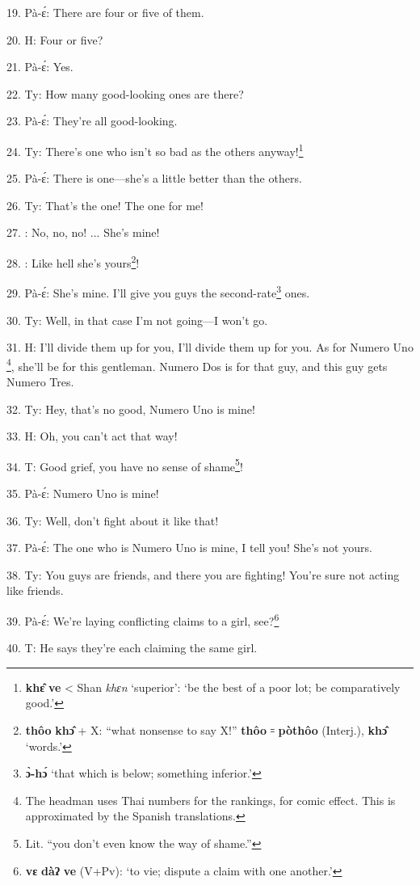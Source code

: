 19. Pà-ɛ́: There are four or five of them.

20. H: Four or five?

21. Pà-ɛ́: Yes.

22. Ty: How many good-looking ones are there?

23. Pà-ɛ́: They're all good-looking.

24. Ty: There's one who isn't so bad as the others anyway!\footnote{\textbf{khɛ̂} \textbf{ve} < Shan \textit{khɛn} `superior': `be the best of a poor lot; be comparatively good.'}

25. Pà-ɛ́: There is one---she's a little better than the others.

26. Ty: That's the one! The one for me!

27. : No, no, no! ... She's mine!

28. : Like hell she's yours\footnote{\textbf{thôo} \textbf{khɔ̂} + X: ``what nonsense to say X!'' \textbf{thôo} ꞊ \textbf{pòthôo} (Interj.), \textbf{khɔ̂} `words.'}!

29. Pà-ɛ́: She's mine. I'll give you guys the second-rate\footnote{\textbf{ɔ̀-hɔ́} `that which is below; something inferior.'} ones.

30. Ty: Well, in that case I'm not going---I won't go.

31. H: I'll divide them up for you, I'll divide them up for you. As for Numero Uno
\footnote{The headman uses Thai numbers for the rankings, for comic effect. This is approximated by the Spanish translations.}, she'll be for this gentleman. Numero Dos is for that guy, and this guy gets
Numero Tres.

32. Ty: Hey, that's no good, Numero Uno is mine!

33. H: Oh, you can't act that way!

34. T: Good grief, you have no sense of shame\footnote{Lit. ``you don't even know the way of shame.''}!

35. Pà-ɛ́: Numero Uno is mine!

36. Ty: Well, don't fight about it like that!

37. Pà-ɛ́: The one who is Numero Uno is mine, I tell you! She's not yours.

38. Ty: You guys are friends, and there you are fighting! You're sure not acting
like friends.

39. Pà-ɛ́: We're laying conflicting claims to a girl, see?\footnote{\textbf{vɛ} \textbf{dàʔ} \textbf{ve} (V+Pv): `to vie; dispute a claim with one another.'}

40. T: He says they're each claiming the same girl.


